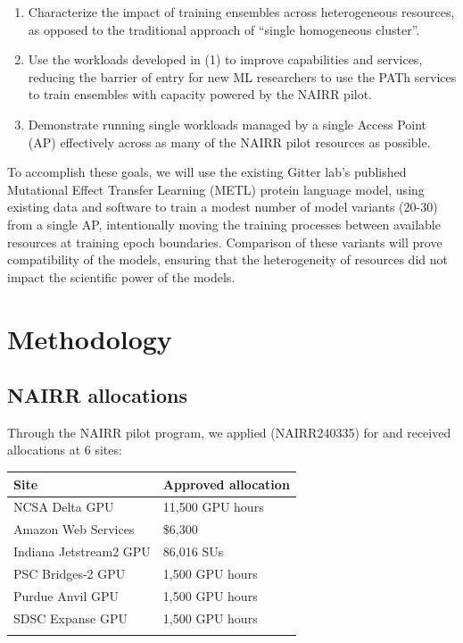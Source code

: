 \documentclass{article}
\providecommand{\tightlist}{%
  \setlength{\itemsep}{0pt}\setlength{\parskip}{0pt}}
\begin{document}
\begin{enumerate}
\tightlist
\item{Characterize the impact of training ensembles across heterogeneous
resources, as opposed to the traditional approach of ``single
homogeneous cluster''.}
\item{Use the workloads developed in (1) to improve capabilities and
services, reducing the barrier of entry for new ML researchers to use
the PATh services to train ensembles with capacity powered by the NAIRR
pilot.}
\item{Demonstrate running single workloads managed by a single Access Point
(AP) effectively across as many of the NAIRR pilot resources as
possible.}
\end{enumerate}

To accomplish these goals, we will use the existing Gitter lab's published
Mutational Effect Transfer Learning (METL) protein language
model\cite{gelmanBiophysicsbasedProteinLanguage2025}, using existing data and
software to train a modest number of model variants (20-30) from a single AP,
intentionally moving the training processes between available resources at
training epoch boundaries. Comparison of these variants will prove compatibility
of the models, ensuring that the heterogeneity of resources did not impact the
scientific power of the models.

\section{Methodology}\label{methodology}

\subsection{NAIRR allocations}\label{nairr-allocations}

Through the NAIRR pilot program, we applied (NAIRR240335) for and
received allocations at 6 sites:

\begin{longtable}[]{@{}ll@{}}
\toprule\noalign{}
Site & Approved allocation \\
\midrule\noalign{}
\endhead
\endlastfoot
NCSA Delta GPU & 11,500 GPU hours \\
Amazon Web Services & \$6,300 \\
Indiana Jetstream2 GPU & 86,016 SUs \\
PSC Bridges-2 GPU & 1,500 GPU hours \\
Purdue Anvil GPU & 1,500 GPU hours \\
SDSC Expanse GPU & 1,500 GPU hours \\
\bottomrule\noalign{}
\end{longtable}
\end{document}
